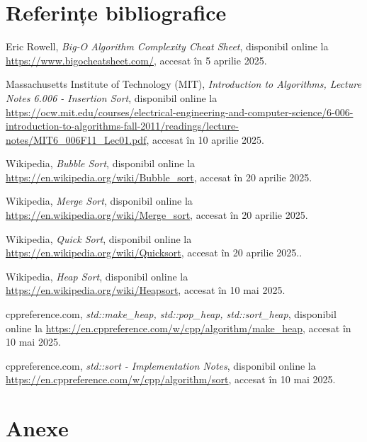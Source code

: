 \documentclass{article}
\begin{document}
\section*{Referințe bibliografice}
\begin{thebibliography}{9}
  Eric Rowell,
  \textit{Big‑O Algorithm Complexity Cheat Sheet},
  disponibil online la \url{https://www.bigocheatsheet.com/},
  accesat în 5 aprilie 2025.

  Massachusetts Institute of Technology (MIT),
  \textit{Introduction to Algorithms, Lecture Notes 6.006 - Insertion Sort},
  disponibil online la \url{https://ocw.mit.edu/courses/electrical-engineering-and-computer-science/6-006-introduction-to-algorithms-fall-2011/readings/lecture-notes/MIT6_006F11_Lec01.pdf},
  accesat în 10 aprilie 2025.

  Wikipedia,
  \textit{Bubble Sort},
  disponibil online la \url{https://en.wikipedia.org/wiki/Bubble_sort},
  accesat în 20 aprilie 2025.

  Wikipedia,
  \textit{Merge Sort},
  disponibil online la \url{https://en.wikipedia.org/wiki/Merge_sort},
  accesat în 20 aprilie 2025.

  Wikipedia,
  \textit{Quick Sort},
  disponibil online la \url{https://en.wikipedia.org/wiki/Quicksort},
  accesat în 20 aprilie 2025..

  Wikipedia,
  \textit{Heap Sort},
  disponibil online la \url{https://en.wikipedia.org/wiki/Heapsort},
  accesat în 10 mai 2025.

  cppreference.com,
  \textit{std::make\_heap, std::pop\_heap, std::sort\_heap},
  disponibil online la \url{https://en.cppreference.com/w/cpp/algorithm/make_heap},
  accesat în 10 mai 2025.

  cppreference.com,
  \textit{std::sort - Implementation Notes},
  disponibil online la \url{https://en.cppreference.com/w/cpp/algorithm/sort},
  accesat în 10 mai 2025.

\end{thebibliography}


\newpage

\appendix
\section*{Anexe}
\end{document}
